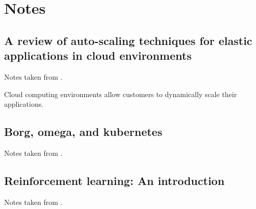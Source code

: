 \chapter*{Notes}
\label{chp:notes}

\section*{A review of auto-scaling techniques for elastic applications in cloud environments}
\label{sec:lorido2014review}

Notes taken from \cite{lorido2014review}.

Cloud computing environments allow customers to dynamically scale their applications.


\section*{Borg, omega, and kubernetes}
\label{sec:burns2016borg}

Notes taken from \cite{burns2016borg}.


\section*{Reinforcement learning: An introduction}
\label{sec:sutton1998reinforcement}

Notes taken from \cite{sutton1998reinforcement}.
